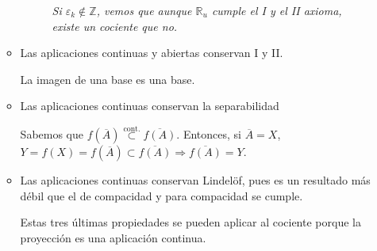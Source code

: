 \begin{demo}
\begin{itemize}
\begin{itemize}
\begin{demo}
        \begin{figure}[H]
            \centering
            \caption{\textit{Si $\varepsilon_k \not\in \mathbb{Z}$, vemos que aunque $\mathbb{R}_u$ cumple el I y el II axioma, existe un cociente que no.}}
            \label{fig:I_ax_II_ax_cocientes}
        \end{figure}
        \end{demo}

        \item Las aplicaciones continuas y abiertas conservan I y II.
        \begin{demo}
            La imagen de una base es una base.
        \end{demo}
        \item Las aplicaciones continuas conservan la separabilidad 
        \begin{demo}
            Sabemos que $f\left( \overline{A} \right) \stackrel{\text{cont.}}{\subset} \overline{f\left( A \right)}$. Entonces, si $\overline{A} = X$, $Y = f\left( X \right) = f\left( \overline{A} \right) \subset \overline{f\left( A \right)} \Rightarrow \overline{f\left( A \right)} = Y$.
        \end{demo}
        \item Las aplicaciones continuas conservan Lindelöf, pues es un resultado más débil que el de compacidad y para compacidad se cumple.

        Estas tres últimas propiedades se pueden aplicar al cociente porque la proyección es una aplicación continua.
    \end{itemize}


\end{itemize}
\end{demo}
